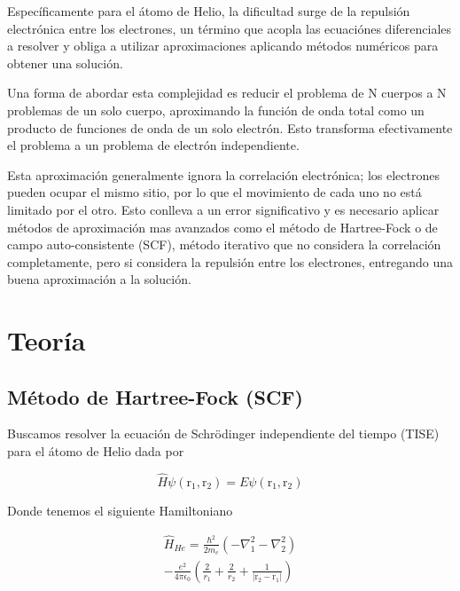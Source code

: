 \documentclass[aps,twocolumn,preprintnumbers]{revtex4}
\begin{document}
  Específicamente para el átomo de Helio, la dificultad surge de la repulsión electrónica entre los electrones, un término que acopla las ecuaciónes diferenciales a resolver y obliga a utilizar aproximaciones aplicando métodos numéricos para obtener una solución.


  Una forma de abordar esta complejidad es reducir el problema de N cuerpos a N problemas de un solo cuerpo, aproximando la función de onda total como un producto de funciones de onda de un solo electrón. Esto transforma efectivamente el problema a un problema de electrón independiente.

  Esta aproximación generalmente ignora la correlación electrónica; los electrones pueden ocupar el mismo sitio, por lo que el movimiento de cada uno no está limitado por el otro. Esto conlleva a un error significativo y es necesario aplicar métodos de aproximación mas avanzados como el método de Hartree-Fock o de campo auto-consistente (SCF), método iterativo que no considera la correlación completamente, pero si considera la repulsión entre los electrones, entregando una buena aproximación a la solución.

  \section{Teoría}

  \subsection{Método de Hartree-Fock (SCF)}

  Buscamos resolver la ecuación de Schrödinger independiente del tiempo (TISE) para el átomo de Helio dada por

  \begin{equation}
    \hat{H} \psi(\bm{\mathrm{r}}_1,\bm{\mathrm{r}}_2) = E\psi(\bm{\mathrm{r}}_1,\bm{\mathrm{r}}_2)
  \end{equation}

  Donde tenemos el siguiente Hamiltoniano

  \begin{multline}
    \hat{H}_{He} = \frac{\hbar^2}{2m_e}\left(-\nabla_1^2 -\nabla_2^2\right) \\- \frac{e^2}{4\pi\epsilon_0}\left(\frac{2}{r_1} + \frac{2}{r_2} + \frac{1}{|\bm{\mathrm{r}}_2-\bm{\mathrm{r}}_1|}\right)
  \end{multline}
\end{document}
